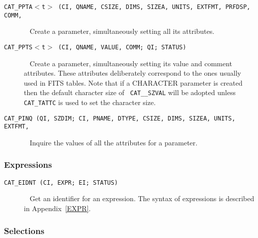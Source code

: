 \begin{description}

  \item[ {\tt CAT\_PPTA$<$t$>$ (CI, QNAME, CSIZE, DIMS, SIZEA, UNITS, 
   EXTFMT, PRFDSP, COMM, } ] ~
  \newline Create a parameter, simultaneously setting all its 
   attributes.

  \item[ {\tt CAT\_PPTS$<$t$>$ (CI, QNAME, VALUE, COMM; QI; STATUS) 
   } ] ~
  \newline Create a parameter, simultaneously setting its value and
   comment attributes. These attributes deliberately correspond to the
   ones usually used in FITS tables. Note that if a CHARACTER
   parameter is created then the default character size of {\tt
   CAT\_\_SZVAL} will be adopted unless {\tt CAT\_TATTC} is used to set 
   the character size.

  \item[ {\tt CAT\_PINQ (QI, SZDIM; CI, PNAME, DTYPE, CSIZE, DIMS, 
   SIZEA, UNITS, EXTFMT, } ] ~
  \newline Inquire the values of all the attributes for a parameter.

\end{description}

\subsubsection{Expressions}

\begin{description}

  \item[ {\tt CAT\_EIDNT (CI, EXPR; EI; STATUS) } ] ~
  \newline Get an identifier for an expression. The syntax of 
   expressions is described in Appendix~\ref{EXPR}.

\end{description}

\subsubsection{Selections}

